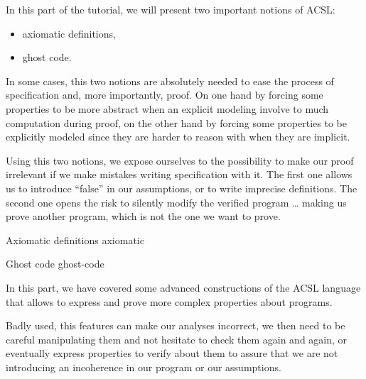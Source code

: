 In this part of the tutorial, we will present two important notions of
ACSL:



\begin{itemize}
\item axiomatic definitions,
\item ghost code.
\end{itemize}


In some cases, this two notions are absolutely needed to ease the
process of specification and, more importantly, proof. On one hand by
forcing some properties to be more abstract when an explicit modeling
involve to much computation during proof, on the other hand by forcing
some properties to be explicitly modeled since they are harder to reason
with when they are implicit.




Using this two notions, we expose ourselves to the possibility to make
our proof irrelevant if we make mistakes writing specification with it.
The first one allows us to introduce ``false'' in our assumptions, or to
write imprecise definitions. The second one opens the risk to silently
modify the verified program \ldots{} making us prove another program,
which is not the one we want to prove.


\begin{levelTwo}
  {Axiomatic definitions}
  {axiomatic}
\end{levelTwo}

\begin{levelTwo}
  {Ghost code}
  {ghost-code}
\end{levelTwo}


\horizontalLine



In this part, we have covered some advanced constructions of the ACSL
language that allows to express and prove more complex properties about
programs.

Badly used, this features can make our analyses incorrect, we then need
to be careful manipulating them and not hesitate to check them again and
again, or eventually express properties to verify about them to assure
that we are not introducing an incoherence in our program or our
assumptions.
